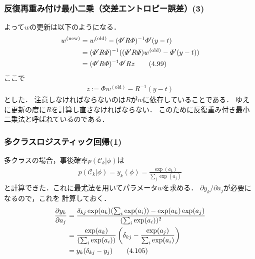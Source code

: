 \documentclass[10pt,%
hyperref={unicode}]{beamer}
\begin{document}
\begin{frame}
    \frametitle{反復再重み付け最小二乗（交差エントロピー誤差）(3)}
    よって$w$の更新は以下のようになる．
    \begin{align}
        w^{\mathrm{(new)}}
        &= w^{\mathrm{(old)}} - (\varPhi'R\varPhi)^{-1}\varPhi'(y - t) \notag \\
        &= (\varPhi'R\varPhi)^{-1}((\varPhi'R\varPhi)w^{\mathrm{(old)}} - \varPhi'(y - t)) \notag \\
        &= (\varPhi'R\varPhi)^{-1}\varPhi' Rz \tag{4.99}
    \end{align}
    ここで
    \begin{align}
        z := \varPhi w^{\mathrm{(old)}} - R^{-1}(y - t)
    \end{align}
    とした．
    注意しなければならないのは$R$が$w$に依存していることである．
    ゆえに更新の度に$R$を計算し直さなければならない．
    このために反復重み付き最小二乗法と呼ばれているのである．
\end{frame}

\begin{frame}
    \frametitle{多クラスロジスティック回帰(1)}
    多クラスの場合，事後確率$p(\mathcal{C}_k|\phi)$は
    \begin{align}
        p(\mathcal{C}_k|\phi) = y_k(\phi) = \frac{\exp(a_k)}{\sum_j \exp (a_j)}
        \tag{4.104}
    \end{align}
    と計算できた．これに最尤法を用いてパラメータ$w$を求める．
    $\partial y_k/\partial a_j$が必要になるので，これを
    計算しておく．
    \begin{align}
        \frac{\partial y_k}{\partial a_j}
        &= \frac{\delta_{kj}\exp(a_k)(\sum_i \exp(a_i))-\exp(a_k)\exp(a_j)}
                {(\sum_i \exp(a_i))^2} \notag \\
        &= \frac{\exp(a_k)}
                {(\sum_i \exp(a_i))}
                \left(\delta_{kj} - \frac{\exp(a_j)}{\sum_i \exp(a_i)} \right)
                \notag \\
                &= y_k(\delta_{kj} - y_j) \tag{4.105}
    \end{align}
\end{frame}
\end{document}
